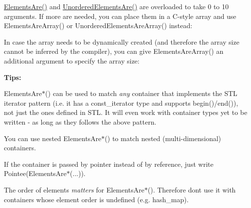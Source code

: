 {\ttfamily \mbox{\hyperlink{namespacetesting_a79cf4ae694bf8231dcf283b325405f27}{Elements\+Are()}}} and {\ttfamily \mbox{\hyperlink{namespacetesting_a8622c12aadfa0e60f7d68683eeb21115}{Unordered\+Elements\+Are()}}} are overloaded to take 0 to 10 arguments. If more are needed, you can place them in a C-\/style array and use {\ttfamily Elements\+Are\+Array()} or {\ttfamily Unordered\+Elements\+Are\+Array()} instead\+:


\begin{DoxyCode}{0}
\DoxyCodeLine{}
\DoxyCodeLine{}
\end{DoxyCode}


In case the array needs to be dynamically created (and therefore the array size cannot be inferred by the compiler), you can give {\ttfamily Elements\+Are\+Array()} an additional argument to specify the array size\+:


\begin{DoxyCode}{0}
\end{DoxyCode}


{\bfseries{Tips\+:}}


\begin{DoxyItemize}
\item {\ttfamily Elements\+Are$\ast$()} can be used to match {\itshape any} container that implements the S\+TL iterator pattern (i.\+e. it has a {\ttfamily const\+\_\+iterator} type and supports {\ttfamily begin()/end()}), not just the ones defined in S\+TL. It will even work with container types yet to be written -\/ as long as they follows the above pattern.
\item You can use nested {\ttfamily Elements\+Are$\ast$()} to match nested (multi-\/dimensional) containers.
\item If the container is passed by pointer instead of by reference, just write {\ttfamily Pointee(\+Elements\+Are$\ast$(...))}.
\item The order of elements {\itshape matters} for {\ttfamily Elements\+Are$\ast$()}. Therefore don\textquotesingle{}t use it with containers whose element order is undefined (e.\+g. {\ttfamily hash\+\_\+map}).
\end{DoxyItemize}

